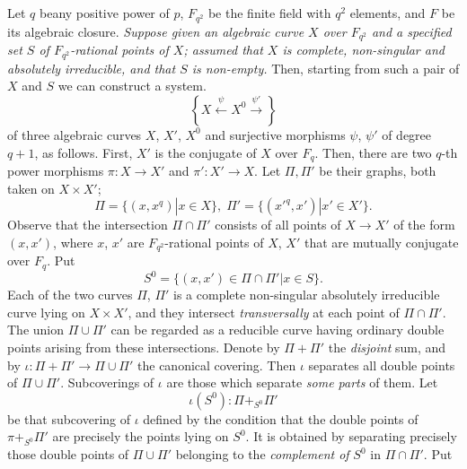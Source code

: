 \subsection{}\label{art6-subsec4.1}
Let $q$ be\pageoriginale any positive power of $p$, $F_{q^2}$ be the finite field with $q^2$ elements, and $F$ be its algebraic closure. \textit{Suppose given an algebraic curve $X$ over $F_{q^2}$ and a specified set $S$ of $F_{q^2}$-rational points of $X$; assumed that $X$ is complete, non-singular and absolutely irreducible, and that $S$ is non-empty.} Then, starting from such a pair of $X$ and $S$ we can construct a system.
\setcounter{equation}{0}
\begin{equation}
\left\{X \xleftarrow{\psi} X^0 \xrightarrow{\psi'} \right\}
\label{art6-eq4.1.1}
\end{equation}
of three algebraic curves $X$, $X'$, $X^0$ and surjective morphisms $\psi$, $\psi'$ of degree $q +1$, as follows. First, $X'$ is the conjugate of $X$ over $F_q$. Then, there are two $q$-th power morphisms $\pi : X \to X'$ and $\pi': X ' \to X$. Let $\Pi, \Pi'$ be their graphs, both taken on $X \times X'$;
\begin{equation}
\Pi = \{(x, x^q) | x \in X\}, \; \Pi' = \{(x'^q, x') | x' \in X'\}. 
\label{art6-eq4.1.2}
\end{equation}
Observe that the intersection $\Pi \cap \Pi'$ consists of all points of $X \to X'$ of the form $(x, x')$, where $x$, $x'$ are $F_{q^2}$-rational points of $X$, $X'$ that are mutually conjugate over $F_q$. Put
\begin{equation}
S^0 = \{(x, x') \in \Pi \cap \Pi' | x \in S\}.\label{art6-eq4.1.3}
\end{equation}
Each of the two curves $\Pi$, $\Pi'$ is a complete non-singular absolutely irreducible curve lying on $X \times X'$, and they intersect \textit{transversally} at each point of $\Pi \cap \Pi'$. The union $\Pi \cup \Pi'$ can be regarded as a reducible curve having ordinary double points arising from these intersections. Denote by $\Pi + \Pi'$ the \textit{disjoint} sum, and by $\iota : \Pi + \Pi' \to \Pi \cup \Pi'$  the canonical covering. Then $\iota$ separates all double points of $\Pi\cup \Pi'$. Subcoverings of $\iota$ are those which separate \textit{some parts} of them. Let 
\begin{equation}
\iota (S^0) : \Pi {\displaystyle{\mathop{+}_{S^0}}} \Pi'
\label{art6-eq4.1.4}
\end{equation}
be that subcovering of $\iota$ defined by the condition that the double points of $\pi  {\displaystyle{\mathop{+}_{S^0}}} \Pi'$ are precisely the points lying on $S^0$. It is obtained by separating precisely those double points of $\Pi \cup \Pi'$ belonging to the \textit{complement of} $S^0$ in $\Pi \cap \Pi'$. Put
